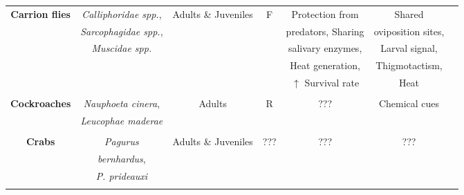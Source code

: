 \begin{landscape}
\begin{table}
\begin{tabular*}{\linewidth}{@{\extracolsep{\fill}}ccccccc}
        \textbf{Carrion flies}	& \textit{Calliphoridae spp.},	&Adults \& Juveniles	&F	&Protection from 	&Shared  	&\citep{ives_aggregation_1991,dos_reis_larval_1999,woodcock_aggregation_2002,gunn_ability_2011,boulay_evidence_2013}\\
        &\textit{Sarcophagidae spp.},	&	&	&predators, Sharing 	&oviposition sites,	&\\
        &\textit{Muscidae spp.}	&	&	&salivary enzymes,	&Larval signal, 	&\\
        &	&	&	&Heat generation, &Thigmotactism,	&\\
        &	&	&	&$\uparrow$ Survival rate 	&Heat	&\\
        &	&	&	&	&	&\\
        
         \textbf{Cockroaches} &\textit{Nauphoeta cinera}, 	&Adults	&R	&???	&Chemical cues	&\cite{everaerts_changes_1997}\\
         &\textit{Leucophae maderae}	&	&	&	&	&\\
         &	&	&	&	&	&\\
         
         \textbf{Crabs} &\textit{Pagurus}	&Adults \& Juveniles	&???	&???	&???	&\cite{meadows_analysis_1973}\\
          & \textit{bernhardus},	&	&	&	&	&\\
          &\textit{P. prideauxi}	&	&	&	&	&\\
          &	&	&	&	&	&\\
          
		\end{tabular*}
\end{table}

\end{landscape}

